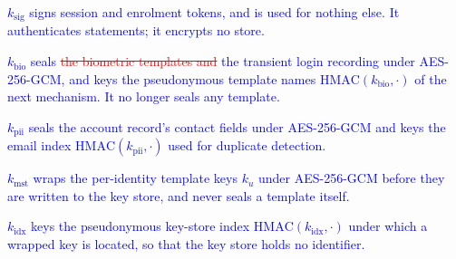 \documentclass[10pt,journal,compsoc]{IEEEtran}
\begin{document}
{\textcolor{blue}{\begin{itemize}[leftmargin=*,topsep=2pt,itemsep=1pt]
\item $k_{\text{sig}}$ signs session and enrolment tokens, and is used for nothing else. It authenticates statements; it encrypts no store.
\item $k_{\text{bio}}$ seals \textcolor{red}{\sout{the biometric templates and}} the transient login recording under AES-256-GCM, and keys the pseudonymous template names $\mathrm{HMAC}(k_{\text{bio}},\cdot)$ of the next mechanism. \textcolor{revpink}{It no longer seals any template.}
\item $k_{\text{pii}}$ seals the account record's contact fields under AES-256-GCM and keys the email index $\mathrm{HMAC}(k_{\text{pii}},\cdot)$ used for duplicate detection.
\textcolor{revpink}{\item $k_{\text{mst}}$ wraps the per-identity template keys $k_u$ under AES-256-GCM before they are written to the key store, and never seals a template itself.}
\textcolor{revpink}{\item $k_{\text{idx}}$ keys the pseudonymous key-store index $\mathrm{HMAC}(k_{\text{idx}},\cdot)$ under which a wrapped key is located, so that the key store holds no identifier.}
\end{itemize}}

}
\end{document}
